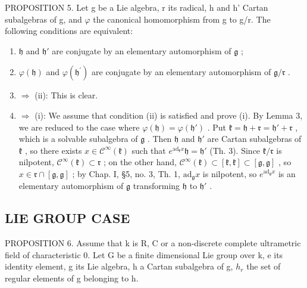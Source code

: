 PROPOSITION 5. Let g be a Lie algebra, r its radical, h and h' Cartan subalgebras of g, and \(\varphi\) the canonical homomorphism from g to g/r. The following conditions are equivalent:

\begin{enumerate}
\def\labelenumi{(\roman{enumi})}
\item
  \(\mathfrak{h}\) and \(\mathfrak{h}'\) are conjugate by an elementary automorphism of \(\mathfrak{g}\) ;
\item
  \(\varphi (\mathfrak{h})\) and \(\varphi (\mathfrak{h}^{\prime})\) are conjugate by an elementary automorphism of \(\mathfrak{g} / \mathfrak{r}\) .
\item
  \(\Longrightarrow\) (ii): This is clear.
\item
  \(\Longrightarrow\) (i): We assume that condition (ii) is satisfied and prove (i). By Lemma 3, we are reduced to the case where \(\varphi(\mathfrak{h}) = \varphi(\mathfrak{h}')\) . Put \(\mathfrak{k} = \mathfrak{h} + \mathfrak{r} = \mathfrak{h}' + \mathfrak{r}\) , which is a solvable subalgebra of \(\mathfrak{g}\) . Then \(\mathfrak{h}\) and \(\mathfrak{h}'\) are Cartan subalgebras of \(\mathfrak{k}\) , so there exists \(x \in \mathcal{C}^{\infty}(\mathfrak{k})\) such that \(e^{\mathrm{ad}_{\mathfrak{k}}x}\mathfrak{h} = \mathfrak{h}'\) (Th. 3). Since \(\mathfrak{k}/\mathfrak{r}\) is nilpotent, \(\mathcal{C}^{\infty}(\mathfrak{k}) \subset \mathfrak{r}\) ; on the other hand, \(\mathcal{C}^{\infty}(\mathfrak{k}) \subset [\mathfrak{k},\mathfrak{k}] \subset [\mathfrak{g},\mathfrak{g}]\) , so \(x \in \mathfrak{r} \cap [\mathfrak{g},\mathfrak{g}]\) ; by Chap. I, §5, no. 3, Th. 1, \(\mathrm{ad}_{\mathfrak{g}}x\) is nilpotent, so \(e^{\mathrm{ad}_{\mathfrak{g}}x}\) is an elementary automorphism of \(\mathfrak{g}\) transforming \(\mathfrak{h}\) to \(\mathfrak{h}'\) .
\end{enumerate}

\subsection{LIE GROUP CASE}

PROPOSITION 6. Assume that k is R, C or a non-discrete complete ultrametric field of characteristic 0. Let G be a finite dimensional Lie group over k, e its identity element, g its Lie algebra, h a Cartan subalgebra of g, \(h_{r}\) the set of regular elements of g belonging to h.

